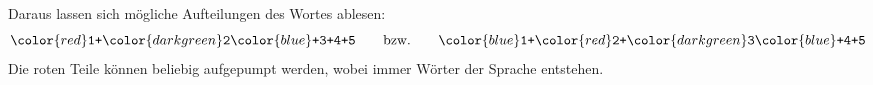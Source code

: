 \begin{loesung}
\begin{center}
\begin{tikzpicture}[>=latex,thick]
\end{tikzpicture}
\end{center}
Daraus lassen sich mögliche Aufteilungen des Wortes ablesen:
\[
\bgroup
\color{red}
\texttt{1+}
\color{darkgreen}
\texttt{2}
\color{blue}
\texttt{+3+4+5}
\egroup
\qquad\text{bzw.}\qquad
\bgroup
\color{blue}
\texttt{1+}
\color{red}
\texttt{2+}
\color{darkgreen}
\texttt{3}
\color{blue}
\texttt{+4+5}
\egroup
\]
Die roten Teile können beliebig aufgepumpt werden, wobei immer
Wörter der Sprache entstehen.
\end{loesung}



